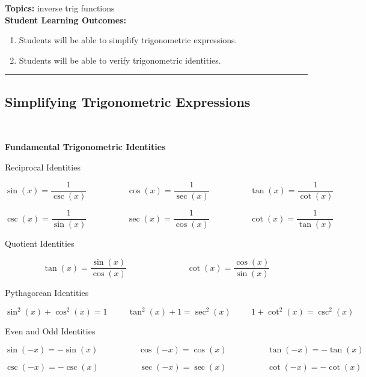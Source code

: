 

\noindent \textbf{Topics:}  inverse trig functions\\

\noindent \textbf{Student Learning Outcomes:}
\begin{enumerate}
\item Students will be able to simplify trigonometric expressions.
\item Students will be able to verify trigonometric identities.

\end{enumerate}

\hrule 

\bigskip

\subsection{Simplifying Trigonometric Expressions} ~

\begin{boxthm}
{\bf Fundamental Trigonometric Identities}

Reciprocal Identities

$$\sin(x) =\frac{1}{\csc(x)} \hspace{2cm}\cos(x) = \frac{1}{\sec(x)}\hspace{2cm}\tan(x) = \frac{1}{\cot(x)}$$

$$\csc(x) =\frac{1}{\sin(x)} \hspace{2cm}\sec(x) = \frac{1}{\cos(x)}\hspace{2cm}\cot(x) = \frac{1}{\tan(x)}$$

Quotient Identities

$$\tan(x) = \frac{\sin(x)}{\cos(x)} \hspace{3cm} \cot(x) = \frac{\cos(x)}{\sin(x)}$$

Pythagorean Identities

$$\sin^2(x) + \cos^2(x)=1 \hspace{1cm}\tan^2(x) +1 = \sec^2(x)
\hspace{1cm} 1+\cot^2(x) = \csc^2(x)$$

Even and Odd Identities

$$\sin( -x) =-\sin(x)\hspace{2cm}\cos( -x) = \cos(x)\hspace{2cm}\tan(- x) = -\tan(x)$$

$$\csc( -x) =-\csc(x)\hspace{2cm}\sec( -x) = \sec(x)\hspace{2cm}\cot(- x) = -\cot(x)$$

\end{boxthm}

